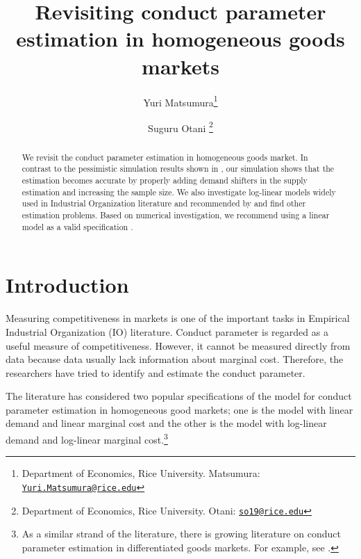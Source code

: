 \documentclass[11pt, a4paper]{article}
\title{Revisiting conduct
parameter estimation in homogeneous goods markets}
\author{Yuri Matsumura\footnote{Department of Economics, Rice University. Matsumura: \texttt{\href{mailto:Yuri.Matsumura@rice.edu}{Yuri.Matsumura@rice.edu}}} \and Suguru Otani \footnote{Department of Economics, Rice University. Otani: \texttt{\href{mailto:so19@rice.edu}{so19@rice.edu}}}}
\begin{document}
\maketitle

\begin{abstract}
    We revisit the conduct parameter estimation in homogeneous goods market. In contrast to the pessimistic simulation results shown in \cite{perloff2012collinearity}, our simulation shows that the estimation becomes accurate by properly adding demand shifters in the supply estimation and increasing the sample size. We also investigate log-linear models widely used in Industrial Organization literature and recommended by \cite{perloff2012collinearity} and find other estimation problems. Based on numerical investigation, we recommend using a linear model as a valid specification . %
\end{abstract}

\section{Introduction}
Measuring competitiveness in markets is one of the important tasks in Empirical Industrial Organization (IO) literature.
Conduct parameter is regarded as a useful measure of competitiveness. 
However, it cannot be measured directly from data because data usually lack information about marginal cost.
Therefore, the researchers have tried to identify and estimate the conduct parameter.

The literature has considered two popular specifications of the model for conduct parameter estimation in homogeneous good markets; one is the model with linear demand and linear marginal cost and the other is the model with log-linear demand and log-linear marginal cost.\footnote{As a similar strand of the literature, there is growing literature on conduct parameter estimation in differentiated goods markets. For example, see \cite{gandhi2021empirical}.}
\end{document}
